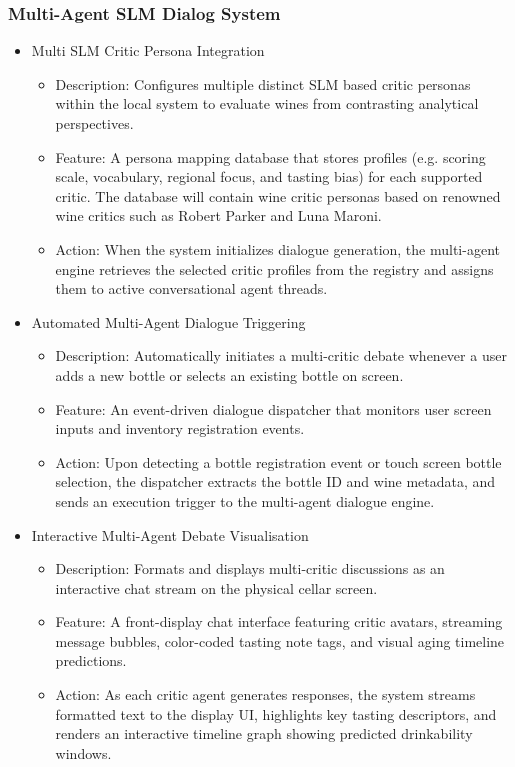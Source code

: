 \documentclass[conference]{IEEEtran}
\begin{document}
\subsubsection{Multi-Agent SLM Dialog System}
\begin{itemize}
    \item Multi SLM Critic Persona Integration
    \begin{itemize}
        \item Description: Configures multiple distinct SLM based critic personas within the local system to evaluate wines from contrasting analytical perspectives.
        \item Feature: A persona mapping database that stores profiles (e.g. scoring scale, vocabulary, regional focus, and tasting bias) for each supported critic. The database will contain wine critic personas based on renowned wine critics such as Robert Parker and Luna Maroni.
        \item Action: When the system initializes dialogue generation, the multi-agent engine retrieves the selected critic profiles from the registry and assigns them to active conversational agent threads.
    \end{itemize}

    \item Automated Multi-Agent Dialogue Triggering
    \begin{itemize}
        \item Description: Automatically initiates a multi-critic debate whenever a user adds a new bottle or selects an existing bottle on screen.
        \item Feature: An event-driven dialogue dispatcher that monitors user screen inputs and inventory registration events.
        \item Action: Upon detecting a bottle registration event or touch screen bottle selection, the dispatcher extracts the bottle ID and wine metadata, and sends an execution trigger to the multi-agent dialogue engine.
    \end{itemize}

    \item Interactive Multi-Agent Debate Visualisation
    \begin{itemize}
        \item Description: Formats and displays multi-critic discussions as an interactive chat stream on the physical cellar screen.
        \item Feature: A front-display chat interface featuring critic avatars, streaming message bubbles, color-coded tasting note tags, and visual aging timeline predictions.
        \item Action: As each critic agent generates responses, the system streams formatted text to the display UI, highlights key tasting descriptors, and renders an interactive timeline graph showing predicted drinkability windows.
    \end{itemize}


\end{itemize}
\end{document}
